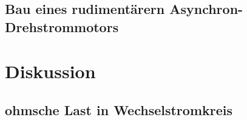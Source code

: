 \documentclass[12pt,english,ngerman]{scrartcl}
\begin{document}

\subsection{Bau eines rudimentärern Asynchron-Drehstrommotors}

\section{Diskussion}\label{sec:diskussion}

\subsection{ohmsche Last in Wechselstromkreis}
\end{document}

